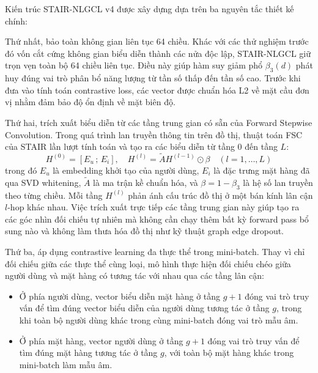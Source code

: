 Kiến trúc STAIR-NLGCL v4 được xây dựng dựa trên ba nguyên tắc thiết kế chính:

Thứ nhất, bảo toàn không gian liên tục 64 chiều. Khác với các thử nghiệm trước đó vốn cắt cứng không gian biểu diễn thành các nửa độc lập, STAIR-NLGCL giữ trọn vẹn toàn bộ 64 chiều liên tục. Điều này giúp hàm suy giảm phổ $\beta_3(d)$ phát huy đúng vai trò phân bổ năng lượng từ tần số thấp đến tần số cao. Trước khi đưa vào tính toán contrastive loss, các vector được chuẩn hóa L2 về mặt cầu đơn vị nhằm đảm bảo độ ổn định về mặt biên độ.

Thứ hai, trích xuất biểu diễn từ các tầng trung gian có sẵn của Forward Stepwise Convolution. Trong quá trình lan truyền thông tin trên đồ thị, thuật toán FSC của STAIR lần lượt tính toán và tạo ra các biểu diễn từ tầng 0 đến tầng $L$:
\begin{equation}
H^{(0)} = [E_u \,;\, E_i], \quad H^{(l)} = \tilde{A} H^{(l-1)} \odot \beta \quad (l = 1, \dots, L)
\end{equation}
trong đó $E_u$ là embedding khởi tạo của người dùng, $E_i$ là đặc trưng mặt hàng đã qua SVD whitening, $\tilde{A}$ là ma trận kề chuẩn hóa, và $\beta = 1 - \beta_3$ là hệ số lan truyền theo từng chiều. Mỗi tầng $H^{(l)}$ phản ánh cấu trúc đồ thị ở một bán kính lân cận $l$-hop khác nhau. Việc trích xuất trực tiếp các tầng trung gian này giúp tạo ra các góc nhìn đối chiếu tự nhiên mà không cần chạy thêm bất kỳ forward pass bổ sung nào và không làm thưa hóa đồ thị như kỹ thuật graph edge dropout.

Thứ ba, áp dụng contrastive learning đa thực thể trong mini-batch. Thay vì chỉ đối chiếu giữa các thực thể cùng loại, mô hình thực hiện đối chiếu chéo giữa người dùng và mặt hàng có tương tác với nhau qua các tầng lân cận:
\begin{itemize}
    \item Ở phía người dùng, vector biểu diễn mặt hàng ở tầng $g+1$ đóng vai trò truy vấn để tìm đúng vector biểu diễn của người dùng tương tác ở tầng $g$, trong khi toàn bộ người dùng khác trong cùng mini-batch đóng vai trò mẫu âm.
    \item Ở phía mặt hàng, vector người dùng ở tầng $g+1$ đóng vai trò truy vấn để tìm đúng mặt hàng tương tác ở tầng $g$, với toàn bộ mặt hàng khác trong mini-batch làm mẫu âm.
\end{itemize}

